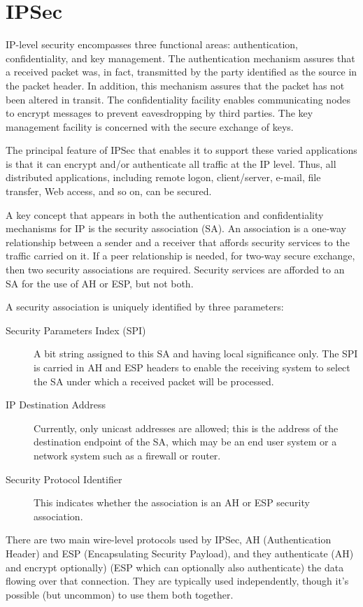 \documentclass[12pt]{article}
\begin{document}
\section{IPSec}
IP-level security encompasses three functional areas: authentication, confidentiality, and key management. The authentication mechanism assures that a received packet was, in fact, transmitted by the party identified as the source in the packet header. In addition, this mechanism assures that the packet has not been altered in transit. The confidentiality facility enables communicating nodes to encrypt messages to prevent eavesdropping by third parties. The key management facility is concerned with the secure exchange of keys.

The principal feature of IPSec that enables it to support these varied applications is that it can encrypt and/or authenticate all traffic at the IP level. Thus, all distributed applications, including remote logon, client/server, e-mail, file transfer, Web access, and so on, can be secured.

A key concept that appears in both the authentication and confidentiality mechanisms for IP is the security association (SA). An association is a one-way relationship between a sender and a receiver that affords security services to the traffic carried on it. If a peer relationship is needed, for two-way secure exchange, then two security associations are required. Security services are afforded to an SA for the use of AH or ESP, but not both.

A security association is uniquely identified by three parameters:
\begin{description}
\item[Security Parameters Index (SPI)] A bit string assigned to this SA and having local significance only. The SPI is carried in AH and ESP headers to enable the receiving system to select the SA under which a received packet will be processed.
\item[IP Destination Address] Currently, only unicast addresses are allowed; this is the address of the destination endpoint of the SA, which may be an end user system or a network system such as a firewall or router.
\item[Security Protocol Identifier] This indicates whether the association is an AH or ESP security association.
\end{description}

There are two main wire-level protocols used by IPSec, AH (Authentication Header) and ESP (Encapsulating Security Payload), and they authenticate (AH) and encrypt optionally) (ESP which can optionally also authenticate) the data flowing over that connection. They are typically used independently, though it's possible (but uncommon) to use them both together.
\end{document}
